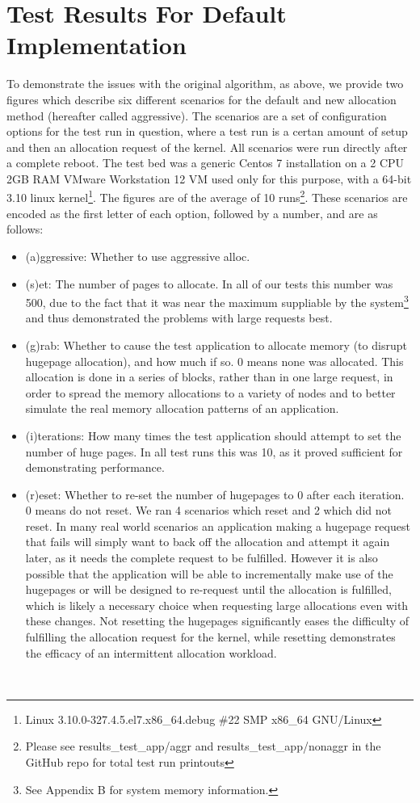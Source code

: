 \documentclass{article}
\begin{document}
\section{Test Results For Default Implementation}
To demonstrate the issues with the original algorithm, as above, we provide two figures which describe six different scenarios for the default and new allocation method (hereafter called aggressive). The scenarios are a set of configuration options for the test run in question, where a test run is a certan amount of setup and then an allocation request of the kernel. All scenarios were run directly after a complete reboot. The test bed was a generic Centos 7 installation on a 2 CPU 2GB RAM VMware Workstation 12 VM used only for this purpose, with a 64-bit 3.10 linux kernel\footnote{Linux 3.10.0-327.4.5.el7.x86\_64.debug \#22 SMP x86\_64 GNU/Linux}. The figures are of the average of 10 runs\footnote{Please see results\_test\_app/aggr and results\_test\_app/nonaggr in the GitHub repo for total test run printouts}. These scenarios are encoded as the first letter of each option, followed by a number, and are as follows:
\begin{itemize}
	\item (a)ggressive: Whether to use aggressive alloc.
	\item (s)et: The number of pages to allocate. In all of our tests this number was 500, due to the fact that it was near the maximum suppliable by the system\footnote{See Appendix B for system memory information.} and thus demonstrated the problems with large requests best.
	\item (g)rab: Whether to cause the test application to allocate memory (to disrupt hugepage allocation), and how much if so. 0 means none was allocated. This allocation is done in a series of blocks, rather than in one large request, in order to spread the memory allocations to a variety of nodes and to better simulate the real memory allocation patterns of an application.
	\item (i)terations: How many times the test application should attempt to set the number of huge pages. In all test runs this was 10, as it proved sufficient for demonstrating performance.
	\item (r)eset: Whether to re-set the number of hugepages to 0 after each iteration. 0 means do not reset. We ran 4 scenarios which reset and 2 which did not reset. In many real world scenarios an application making a hugepage request that fails will simply want to back off the allocation and attempt it again later, as it needs the complete request to be fulfilled. However it is also possible that the application will be able to incrementally make use of the hugepages or will be designed to re-request until the allocation is fulfilled, which is likely a necessary choice when requesting large allocations even with these changes. Not resetting the hugepages significantly eases the difficulty of fulfilling the allocation request for the kernel, while resetting demonstrates the efficacy of an intermittent allocation workload.
\end{itemize}\
\end{document}

